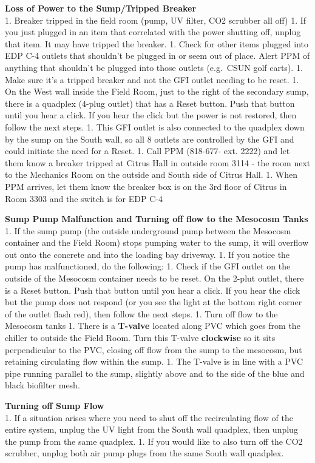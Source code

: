 \documentclass[]{book}
\begin{document}
 \textbf{Loss of Power to the Sump/Tripped Breaker}\\
1. Breaker tripped in the field room (pump, UV filter, CO2 scrubber all
off) 1. If you just plugged in an item that correlated with the power
shutting off, unplug that item. It may have tripped the breaker. 1.
Check for other items plugged into EDP C-4 outlets that shouldn't be
plugged in or seem out of place. Alert PPM of anything that shouldn't be
plugged into those outlets (e.g.~CSUN golf carts). 1. Make sure it's a
tripped breaker and not the GFI outlet needing to be reset. 1. On the
West wall inside the Field Room, just to the right of the secondary
sump, there is a quadplex (4-plug outlet) that has a Reset button. Push
that button until you hear a click. If you hear the click but the power
is not restored, then follow the next steps. 1. This GFI outlet is also
connected to the quadplex down by the sump on the South wall, so all 8
outlets are controlled by the GFI and could initiate the need for a
Reset. 1. Call PPM (818-677- ext. 2222) and let them know a breaker
tripped at Citrus Hall in outside room 3114 - the room next to the
Mechanics Room on the outside and South side of Citrus Hall. 1. When PPM
arrives, let them know the breaker box is on the 3rd floor of Citrus in
Room 3303 and the switch is for EDP C-4

 \textbf{Sump Pump Malfunction and Turning off flow to the Mesocosm
Tanks}\\
1. If the sump pump (the outside underground pump between the Mesocosm
container and the Field Room) stops pumping water to the sump, it will
overflow out onto the concrete and into the loading bay driveway. 1. If
you notice the pump has malfunctioned, do the following: 1. Check if the
GFI outlet on the outside of the Mesocosm container needs to be reset.
On the 2-plut outlet, there is a Reset button. Push that button until
you hear a click. If you hear the click but the pump does not respond
(or you see the light at the bottom right corner of the outlet flash
red), then follow the next steps. 1. Turn off flow to the Mesocosm tanks
1. There is a \textbf{T-valve} located along PVC which goes from the
chiller to outside the Field Room. Turn this T-valve \textbf{clockwise}
so it sits perpendicular to the PVC, closing off flow from the sump to
the mesocosm, but retaining circulating flow within the sump. 1. The
T-valve is in line with a PVC pipe running parallel to the sump,
slightly above and to the side of the blue and black biofilter mesh.

 \textbf{Turning off Sump Flow}\\
1. If a situation arises where you need to shut off the recirculating
flow of the entire system, unplug the UV light from the South wall
quadplex, then unplug the pump from the same quadplex. 1. If you would
like to also turn off the CO2 scrubber, unplug both air pump plugs from
the same South wall quadplex.
\end{document}
